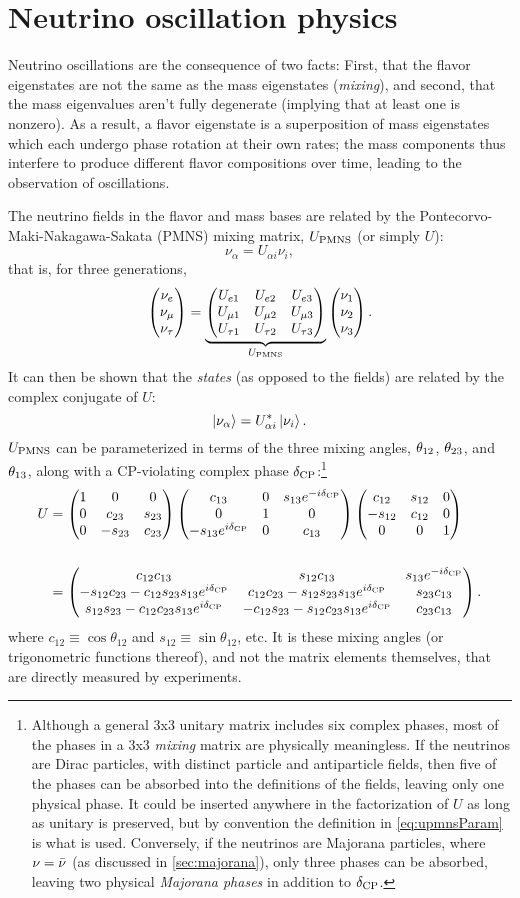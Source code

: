 \documentclass[../thesis.tex]{subfiles}
\begin{document}
\section{Neutrino oscillation physics}
\label{sec:oscPhysics}

Neutrino oscillations are the consequence of two facts: First, that the flavor eigenstates are not the same as the mass eigenstates (\emph{mixing}), and second, that the mass eigenvalues aren't fully degenerate (implying that at least one is nonzero). As a result, a flavor eigenstate is a superposition of mass eigenstates which each undergo phase rotation at their own rates; the mass components thus interfere to produce different flavor compositions over time, leading to the observation of oscillations.

The neutrino fields in the flavor and mass bases are related by the Pontecorvo-Maki-Nakagawa-Sakata (PMNS) mixing matrix, $U_\mathrm{PMNS}$ (or simply $U$):
\begin{equation}
  \nu_\alpha = U_{\alpha i} \nu_i,
\end{equation}
that is, for three generations,
\begin{equation}
  \begin{pmatrix} \nu_e \\ \nu_\mu \\ \nu_\tau \end{pmatrix} = \underbrace{\begin{pmatrix} U_{e 1} & U_{e 2} & U_{e 3} \\ U_{\mu 1} & U_{\mu 2} & U_{\mu 3} \\ U_{\tau 1} & U_{\tau 2} & U_{\tau 3} \end{pmatrix}}_{U_\mathrm{PMNS}} \begin{pmatrix} \nu_1 \\ \nu_2 \\ \nu_3 \end{pmatrix}.
\end{equation}
It can then be shown that the \emph{states} (as opposed to the fields) are related by the complex conjugate of $U$:
\begin{equation}
  \label{eq:nuStateRel}
  \ket{\nu_\alpha} = U^*_{\alpha i}\ket{\nu_i}.
\end{equation}
$U_\mathrm{PMNS}$ can be parameterized in terms of the three mixing angles, $\theta_{12}$, $\theta_{23}$, and $\theta_{13}$, along with a CP-violating complex phase $\delta_\text{CP}$:\footnote{Although a general 3x3 unitary matrix includes six complex phases, most of the phases in a 3x3 \emph{mixing} matrix are physically meaningless. If the neutrinos are Dirac particles, with distinct particle and antiparticle fields, then five of the phases can be absorbed into the definitions of the fields, leaving only one physical phase. It could be inserted anywhere in the factorization of $U$ as long as unitary is preserved, but by convention the definition in \eqref{eq:upmnsParam} is what is used. Conversely, if the neutrinos are Majorana particles, where $\nu = \bar\nu$ (as discussed in \autoref{sec:majorana}), only three phases can be absorbed, leaving two physical \emph{Majorana phases} in addition to $\delta_\text{CP}$.}
\begin{align}
  \label{eq:upmnsParam}
  \begin{split}
    U &= \begin{pmatrix} 1 & 0 & 0 \\ 0 & c_{23} & s_{23} \\ 0 & -s_{23} & c_{23} \end{pmatrix} \begin{pmatrix} c_{13} & 0 & s_{13}e^{-i\delta_\text{CP}} \\ 0 & 1 & 0 \\ -s_{13}e^{i\delta_\text{CP}} & 0 & c_{13} \end{pmatrix} \begin{pmatrix} c_{12} & s_{12} & 0 \\ -s_{12} & c_{12} & 0 \\ 0 & 0 & 1 \end{pmatrix} \\\\
    &= \begin{pmatrix} c_{12}c_{13} & s_{12} c_{13} & s_{13}e^{-i\delta_\text{CP}} \\ -s_{12}c_{23} - c_{12}s_{23}s_{13}e^{i\delta_\text{CP}} & c_{12}c_{23} - s_{12}s_{23}s_{13}e^{i\delta_\text{CP}} & s_{23}c_{13}\\s_{12}s_{23} - c_{12}c_{23}s_{13}e^{i\delta_\text{CP}} & -c_{12}s_{23} - s_{12}c_{23}s_{13}e^{i\delta_\text{CP}} & c_{23}c_{13} \end{pmatrix}.
  \end{split}
\end{align}
where \(c_{12} \equiv \cos\theta_{12}\) and \(s_{12} \equiv \sin\theta_{12}\), etc. It is these mixing angles (or trigonometric functions thereof), and not the matrix elements themselves, that are directly measured by experiments.
\end{document}
